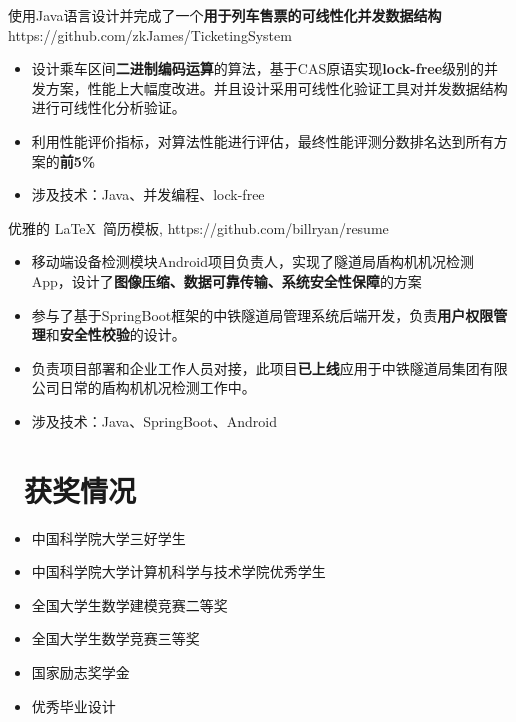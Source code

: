 \documentclass{resume}
\begin{document}
\begin{onehalfspacing}
  使用Java语言设计并完成了一个\textbf{用于列车售票的可线性化并发数据结构}\\https://github.com/zkJames/TicketingSystem
\begin{itemize}
  \item 设计乘车区间\textbf{二进制编码运算}的算法，基于CAS原语实现\textbf{lock-free}级别的并发方案，性能上大幅度改进。并且设计采用可线性化验证工具对并发数据结构进行可线性化分析验证。
  \item 利用性能评价指标，对算法性能进行评估，最终性能评测分数排名达到所有方案的\textbf{前5\%}
  \item 涉及技术：Java、并发编程、lock-free
\end{itemize}
\end{onehalfspacing}

\begin{onehalfspacing}
优雅的 \LaTeX\ 简历模板, https://github.com/billryan/resume
\begin{itemize}
  \item 移动端设备检测模块Android项目负责人，实现了隧道局盾构机机况检测App，设计了\textbf{图像压缩、数据可靠传输、系统安全性保障}的方案
  \item 参与了基于SpringBoot框架的中铁隧道局管理系统后端开发，负责\textbf{用户权限管理}和\textbf{安全性校验}的设计。
  \item 负责项目部署和企业工作人员对接，此项目\textbf{已上线}应用于中铁隧道局集团有限公司日常的盾构机机况检测工作中。
  \item 涉及技术：Java、SpringBoot、Android
\end{itemize}
\end{onehalfspacing}


\section{\faHeartO\ 获奖情况}
\begin{itemize}[parsep=0.5ex]
  \item 中国科学院大学三好学生
  \item 中国科学院大学计算机科学与技术学院优秀学生
  \item 全国大学生数学建模竞赛二等奖
  \item 全国大学生数学竞赛三等奖
  \item 国家励志奖学金
  \item 优秀毕业设计
\end{itemize}
\end{document}
